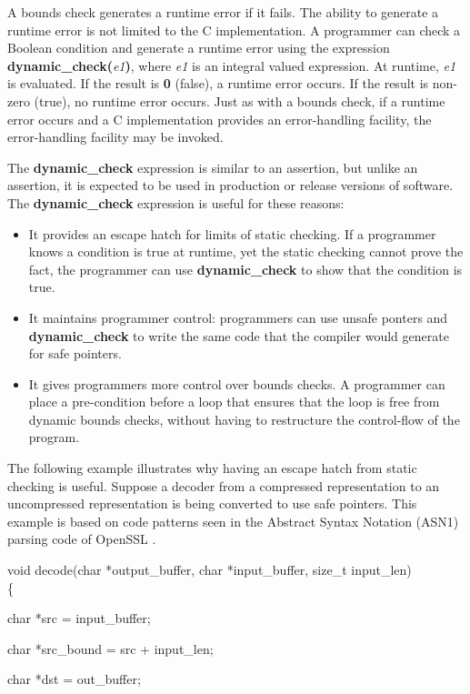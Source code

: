 \documentclass[]{article}
\begin{document}
A bounds check generates a runtime error if it fails. The ability to
generate a runtime error is not limited to the C implementation. A
programmer can check a Boolean condition and generate a runtime error
using the expression \textbf{dynamic\_check(}\emph{e1}\textbf{)}, where
\emph{e1} is an integral valued expression. At runtime, \emph{e1} is
evaluated. If the result is \textbf{0} (false), a runtime error occurs.
If the result is non-zero (true), no runtime error occurs. Just as with
a bounds check, if a runtime error occurs and a C implementation
provides an error-handling facility, the error-handling facility may be
invoked.

The \textbf{dynamic\_check} expression is similar to an assertion, but
unlike an assertion, it is expected to be used in production or release
versions of software. The \textbf{dynamic\_check} expression is useful
for these reasons:

\begin{itemize}
\item
  It provides an escape hatch for limits of static checking. If a
  programmer knows a condition is true at runtime, yet the static
  checking cannot prove the fact, the programmer can use
  \textbf{dynamic\_check} to show that the condition is true.
\item
  It maintains programmer control: programmers can use unsafe ponters
  and \textbf{dynamic\_check} to write the same code that the compiler
  would generate for safe pointers.
\item
  It gives programmers more control over bounds checks. A programmer can
  place a pre-condition before a loop that ensures that the loop is free
  from dynamic bounds checks, without having to restructure the
  control-flow of the program.
\end{itemize}

The following example illustrates why having an escape hatch from static
checking is useful. Suppose a decoder from a compressed representation
to an uncompressed representation is being converted to use safe
pointers. This example is based on code patterns seen in the Abstract
Syntax Notation (ASN1) parsing code of OpenSSL .

void decode(char *output\_buffer, char *input\_buffer, size\_t
input\_len)\\
\{

char *src = input\_buffer;

char *src\_bound = src + input\_len;

char *dst = out\_buffer;
\end{document}
